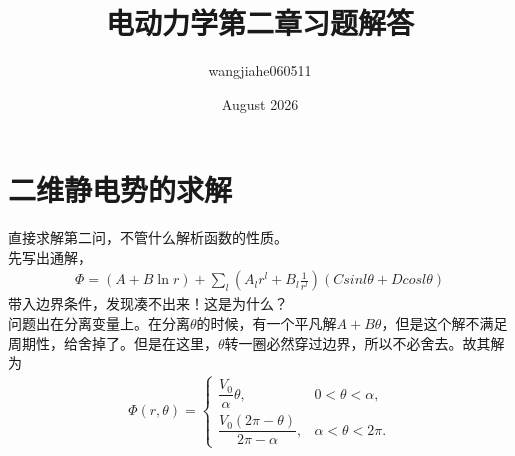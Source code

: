\documentclass{article}
\title{电动力学第二章习题解答}
\author{wangjiahe060511 }
\date{August 2026}
\begin{document}
\maketitle
\section{二维静电势的求解}
直接求解第二问，不管什么解析函数的性质。\\
先写出通解，\begin{align}
    \Phi=(A+B\ln r)+\sum_l(A_lr^l+B_l\frac{1}{r^l})(Csinl\theta+Dcosl\theta)
\end{align}
带入边界条件，发现凑不出来！这是为什么？\\
问题出在分离变量上。在分离$\theta$的时候，有一个平凡解$A+B\theta$，但是这个解不满足周期性，给舍掉了。但是在这里，$\theta$转一圈必然穿过边界，所以不必舍去。故其解为\begin{align}
\boxed{
\Phi(r,\theta)=
\begin{cases}
\dfrac{V_0}{\alpha}\theta,
& 0<\theta<\alpha,\\[8pt]
\dfrac{V_0(2\pi-\theta)}{2\pi-\alpha},
& \alpha<\theta<2\pi.
\end{cases}
}
\end{align}
\end{document}
